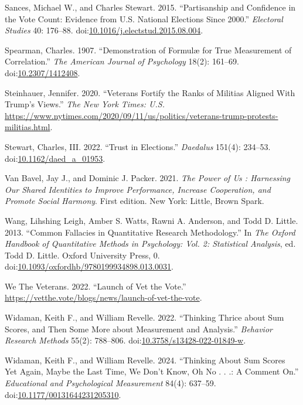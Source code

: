 \documentclass[
  12pt,
  letterpaper,
]{article}
\newlength{\cslhangindent}
\newenvironment{CSLReferences}[2] %
 {\begin{list}{}{%
  \setlength{\itemindent}{0pt}
  \setlength{\leftmargin}{0pt}
  \setlength{\parsep}{0pt}
  \ifodd #1
   \setlength{\leftmargin}{\cslhangindent}
   \setlength{\itemindent}{-1\cslhangindent}
  \fi
  \setlength{\itemsep}{#2\baselineskip}}}
 {\end{list}}
\begin{document}
\begin{CSLReferences}{1}{1}
Sances, Michael W., and Charles Stewart. 2015. {``Partisanship and
Confidence in the Vote Count: {Evidence} from {U}.{S}. National
Elections Since 2000.''} \emph{Electoral Studies} 40: 176--88.
doi:\href{https://doi.org/10.1016/j.electstud.2015.08.004}{10.1016/j.electstud.2015.08.004}.

Spearman, Charles. 1907. {``Demonstration of {Formulæ} for {True
Measurement} of {Correlation}.''} \emph{The American Journal of
Psychology} 18(2): 161--69.
doi:\href{https://doi.org/10.2307/1412408}{10.2307/1412408}.

Steinhauer, Jennifer. 2020. {``Veterans {Fortify} the {Ranks} of
{Militias Aligned With Trump}'s {Views}.''} \emph{The New York Times:
U.S.}
\url{https://www.nytimes.com/2020/09/11/us/politics/veterans-trump-protests-militias.html}.

Stewart, Charles, III. 2022. {``Trust in {Elections}.''} \emph{Daedalus}
151(4): 234--53.
doi:\href{https://doi.org/10.1162/daed_a_01953}{10.1162/daed\_a\_01953}.

Van Bavel, Jay J., and Dominic J. Packer. 2021. \emph{The Power of Us :
Harnessing Our Shared Identities to Improve Performance, Increase
Cooperation, and Promote Social Harmony}. First edition. New York:
Little, Brown Spark.

Wang, Lihshing Leigh, Amber S. Watts, Rawni A. Anderson, and Todd D.
Little. 2013. {``Common {Fallacies} in {Quantitative Research
Methodology}.''} In \emph{The {Oxford Handbook} of {Quantitative
Methods} in {Psychology}: {Vol}. 2: {Statistical Analysis}}, ed. Todd D.
Little. Oxford University Press, 0.
doi:\href{https://doi.org/10.1093/oxfordhb/9780199934898.013.0031}{10.1093/oxfordhb/9780199934898.013.0031}.

We The Veterans. 2022. {``Launch of {Vet} the {Vote}.''}
\url{https://vetthe.vote/blogs/news/launch-of-vet-the-vote}.

Widaman, Keith F., and William Revelle. 2022. {``Thinking Thrice about
Sum Scores, and Then Some More about Measurement and Analysis.''}
\emph{Behavior Research Methods} 55(2): 788--806.
doi:\href{https://doi.org/10.3758/s13428-022-01849-w}{10.3758/s13428-022-01849-w}.

Widaman, Keith F., and William Revelle. 2024. {``Thinking {About Sum
Scores Yet Again}, {Maybe} the {Last Time}, {We Don}'t {Know}, {Oh No} .
. .: {A Comment} On.''} \emph{Educational and Psychological Measurement}
84(4): 637--59.
doi:\href{https://doi.org/10.1177/00131644231205310}{10.1177/00131644231205310}.


\end{CSLReferences}
\end{document}
